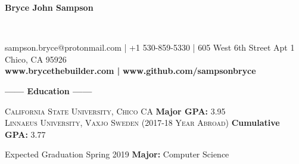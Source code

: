 \documentclass[12pt]{article}
\begin{document}
\sffamily
\lsstyle
\color{white}
\center
\begin{Huge}\textbf{Bryce John Sampson}\end{Huge}\\
\medskip
\fontsize{12}{1.2}
\selectfont
\smallbreak
\colorbox{accent}{
    \parbox{45em}{
        \centering
        \color{secondary}
        sampson.bryce@protonmail.com | +1 530-859-5330 | 605 West 6th Street Apt 1 Chico, CA 95926 \\
        \large
        \textbf{\color{primary}www.brycethebuilder.com |}
        \textbf{\color{primary}www.github.com/sampsonbryce}
    }
}
\smallskip
\center
\textbf{\Large------ Education ------}\\
\flushleft
\begin{footnotesize}
\textsc{California State University, Chico CA}
\hfill
\textbf{\color{primary}Major GPA: }3.95\\

\smallskip
\textsc{Linnaeus University, Vaxjo Sweden (2017-18 Year Abroad)}
\hfill
\textbf{\color{primary}Cumulative GPA: }3.77\\
\smallskip

{\color{accent}Expected Graduation Spring 2019}
\hfill
\textbf{\color{primary}Major: }Computer Science\\
\smallskip

\end{footnotesize}
\end{document}
